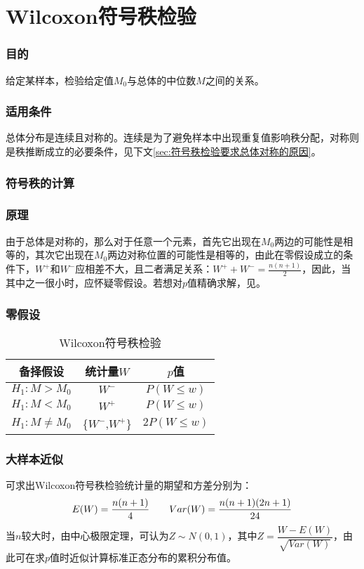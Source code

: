 \section{Wilcoxon符号秩检验}

\subsubsection{目的}
给定某样本，检验给定值$M_0$与总体的中位数$M$之间的关系。
\subsubsection{适用条件}
总体分布是连续且对称的。连续是为了避免样本中出现重复值影响秩分配，对称则是秩推断成立的必要条件，见下文\ref{sec:符号秩检验要求总体对称的原因}。
\subsubsection{符号秩的计算}

\subsubsection{原理}
由于总体是对称的，那么对于任意一个元素，首先它出现在$M_0$两边的可能性是相等的，其次它出现在$M_0$两边对称位置的可能性是相等的\label{sec:符号秩检验要求总体对称的原因}，由此在零假设成立的条件下，$W^+$和$W^-$应相差不大，且二者满足关系：$W^+ + W^- = \frac{n(n+1)}{2}$，因此，当其中之一很小时，应怀疑零假设。若想对$p$值精确求解，见。
\subsubsection{零假设}
\begin{table}[htbp]
	\centering
	\begin{tabular}{ccc}
		\toprule
		备择假设 & 统计量$W$ & $p$值 \\
		\midrule 
		$H_1:M>M_0$ & $W^-$ & $P(W\leqslant w)$ \\
		$H_1:M<M_0$ & $W^+$ & $P(W\leqslant w)$ \\
		$H_1:M\ne M_0$ & \text{min}\{$W^-$,\;$W^+$\} & $2P(W\leqslant w)$ \\
		\bottomrule 
	\end{tabular}
	\caption{Wilcoxon符号秩检验}
\end{table}
	
\subsubsection{大样本近似}
可求出Wilcoxon符号秩检验统计量的期望和方差分别为：
\begin{equation}
	E(W)=\frac{n(n+1)}{4}\qquad Var(W)=\frac{n(n+1)(2n+1)}{24}\notag
\end{equation}
\hspace{2em}当$n$较大时，由中心极限定理，可认为$Z\sim N(0,1)$，其中$Z=\dfrac{W-E(W)}{\sqrt{Var(W)}}$，由此可在求$p$值时近似计算标准正态分布的累积分布值。
